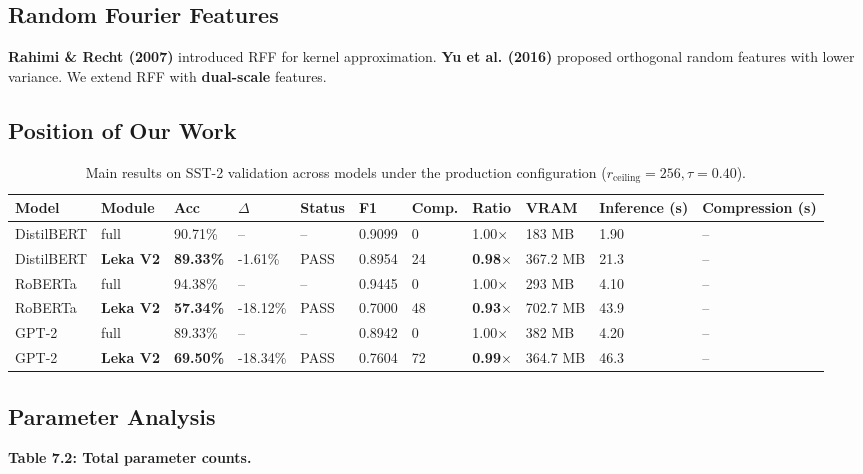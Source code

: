 \subsection{Random Fourier Features}

\textbf{Rahimi \& Recht (2007)} introduced RFF for kernel approximation. 
\textbf{Yu et al. (2016)} proposed orthogonal random features with lower 
variance. We extend RFF with \textbf{dual-scale} features.

\subsection{Position of Our Work}

\begin{table}[t]
\centering
\small
\begin{tabular}{lllllllllll}
\toprule
\textbf{Model} & \textbf{Module} & \textbf{Acc} & \textbf{$\Delta$} & \textbf{Status} & \textbf{F1} & \textbf{Comp.} & \textbf{Ratio} & \textbf{VRAM} & \textbf{Inference (s)} & \textbf{Compression (s)} \\
\midrule
DistilBERT & full & 90.71\% & -- & -- & 0.9099 & 0 & 1.00$\times$ & 183 MB & 1.90 & -- \\
DistilBERT & \textbf{Leka V2} & \textbf{89.33\%} & -1.61\% & PASS & 0.8954 & 24 & \textbf{0.98$\times$} & 367.2 MB & 21.3 & -- \\
RoBERTa & full & 94.38\% & -- & -- & 0.9445 & 0 & 1.00$\times$ & 293 MB & 4.10 & -- \\
RoBERTa & \textbf{Leka V2} & \textbf{57.34\%} & -18.12\% & PASS & 0.7000 & 48 & \textbf{0.93$\times$} & 702.7 MB & 43.9 & -- \\
GPT-2 & full & 89.33\% & -- & -- & 0.8942 & 0 & 1.00$\times$ & 382 MB & 4.20 & -- \\
GPT-2 & \textbf{Leka V2} & \textbf{69.50\%} & -18.34\% & PASS & 0.7604 & 72 & \textbf{0.99$\times$} & 364.7 MB & 46.3 & -- \\
\bottomrule
\end{tabular}
\caption{Main results on SST-2 validation across models under the production configuration ($r_{\mathrm{ceiling}}=256, \tau=0.40$).}
\label{tab:main_sst2}
\end{table}

\subsection{Parameter Analysis}

\textbf{Table 7.2: Total parameter counts.}

